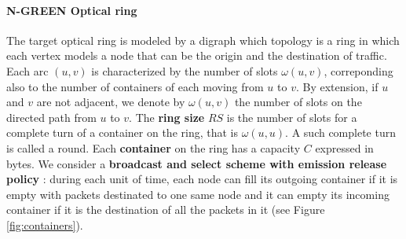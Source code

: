 \documentclass[10pt, conference, letterpaper]{IEEEtran}
\begin{document}
  \paragraph{N-GREEN Optical ring}

  The target optical ring is modeled by a digraph which topology is a ring in which each vertex models a node that can be the origin and the destination of traffic.  Each arc $(u,v)$  is characterized by the number of slots $\omega(u,v)$, correponding also to the number of containers of each   moving from $u$ to $v$.  By extension, if $u$ and $v$ are not adjacent, we denote by $\omega(u,v)$ the number of slots on the directed path from $u$ to $v$.  The \textbf{ring size} $RS$ is the number of slots for a complete turn of a container on the ring, that is $\omega(u,u)$. A such complete turn is called a round. Each  {\bf container} on the ring has a capacity $C$  expressed in bytes. We consider a {\bf broadcast and select scheme with emission release policy} : during each unit of time, each node can fill its outgoing container   if it is empty with packets destinated to one same node and it can empty its incoming container  if it is the destination of all the packets in it (see Figure \ref{fig:containers}).
\end{document}

